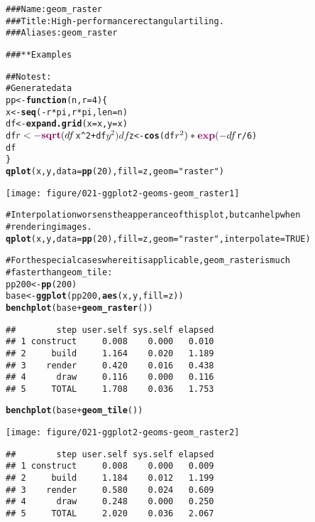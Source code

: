 \documentclass[a4paper,titlepage]{tufte-handout}\usepackage{graphicx, color}
\makeatletter
\def\maxwidth{ %
  \ifdim\Gin@nat@width>\linewidth
    \linewidth
  \else
    \Gin@nat@width
  \fi
}
\newcommand{\hlfunctioncall}[1]{\textcolor[rgb]{0.501960784313725,0,0.329411764705882}{\textbf{#1}}}%
\newcommand{\hlstring}[1]{\textcolor[rgb]{0.6,0.6,1}{#1}}%
\newcommand{\hlcomment}[1]{\textcolor[rgb]{0.180392156862745,0.6,0.341176470588235}{#1}}%
\newenvironment{kframe}{%
 \def\at@end@of@kframe{}%
 \ifinner\ifhmode%
  \def\at@end@of@kframe{\end{minipage}}%
  \begin{minipage}{\columnwidth}%
 \fi\fi%
 \def\FrameCommand##1{\hskip\@totalleftmargin \hskip-\fboxsep
 \colorbox{shadecolor}{##1}\hskip-\fboxsep
     \hskip-\linewidth \hskip-\@totalleftmargin \hskip\columnwidth}%
 \MakeFramed {\advance\hsize-\width
   \@totalleftmargin\z@ \linewidth\hsize
   \@setminipage}}%
 {\par\unskip\endMakeFramed%
 \at@end@of@kframe}
\newenvironment{knitrout}{}{} %
\makeatother
\begin{document}
\begin{knitrout}
\color{fgcolor}\begin{kframe}
\begin{alltt}
\hlcomment{### Name: geom_raster}
\hlcomment{### Title: High-performance rectangular tiling.}
\hlcomment{### Aliases: geom_raster}

\hlcomment{### ** Examples}

\hlcomment{## No test: }
\hlcomment{# Generate data}
pp <- \hlfunctioncall{function} (n,r=4) \{
 x <- \hlfunctioncall{seq}(-r*pi, r*pi, len=n)
 df <- \hlfunctioncall{expand.grid}(x=x, y=x)
 df$r <- \hlfunctioncall{sqrt}(df$x^2 + df$y^2)
 df$z <- \hlfunctioncall{cos}(df$r^2)*\hlfunctioncall{exp}(-df$r/6)
 df
\}
\hlfunctioncall{qplot}(x, y, data = \hlfunctioncall{pp}(20), fill = z, geom = \hlstring{"raster"})
\end{alltt}
\end{kframe}
\texttt{[image: figure/021-ggplot2-geoms-geom\_raster1]} 
\begin{kframe}\begin{alltt}
\hlcomment{# Interpolation worsens the apperance of this plot, but can help when}
\hlcomment{# rendering images.}
\hlfunctioncall{qplot}(x, y, data = \hlfunctioncall{pp}(20), fill = z, geom = \hlstring{"raster"}, interpolate = TRUE)

\hlcomment{# For the special cases where it is applicable, geom_raster is much}
\hlcomment{# faster than geom_tile:}
pp200 <- \hlfunctioncall{pp}(200)
base <- \hlfunctioncall{ggplot}(pp200, \hlfunctioncall{aes}(x, y, fill = z))
\hlfunctioncall{benchplot}(base + \hlfunctioncall{geom_raster}())
\end{alltt}
\begin{verbatim}
##        step user.self sys.self elapsed
## 1 construct     0.008    0.000   0.010
## 2     build     1.164    0.020   1.189
## 3    render     0.420    0.016   0.438
## 4      draw     0.116    0.000   0.116
## 5     TOTAL     1.708    0.036   1.753
\end{verbatim}
\begin{alltt}
\hlfunctioncall{benchplot}(base + \hlfunctioncall{geom_tile}())
\end{alltt}
\end{kframe}
\texttt{[image: figure/021-ggplot2-geoms-geom\_raster2]} 
\begin{kframe}\begin{verbatim}
##        step user.self sys.self elapsed
## 1 construct     0.008    0.000   0.009
## 2     build     1.184    0.012   1.199
## 3    render     0.580    0.024   0.609
## 4      draw     0.248    0.000   0.250
## 5     TOTAL     2.020    0.036   2.067
\end{verbatim}
\begin{alltt}


\end{alltt}
\end{kframe}
\end{knitrout}
\end{document}
